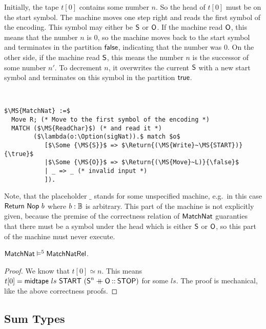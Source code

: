 Initially, the tape $t[0]$ contains some number $n$.  So the head of $t[0]$ must be on the start symbol.  The machine moves one step right and reads
the first symbol of the encoding.  This symbol may either be $\textsf{S}$ or $\textsf{O}$.  If the machine read $\textsf{O}$, this means that the number $n$ is
$0$, so the machine moves back to the start symbol and terminates in the partition $\textsf{false}$, indicating that the number was $0$.  On the other side,
if the machine read $\textsf{S}$, this means the number $n$ is the successor of some number $n'$.  To decrement $n$, it overwrites the current $\textsf{S}$
with a new start symbol and terminates on this symbol in the partition $\textsf{true}$.

\begin{definition}[$\MS{MatchNat}$]
  \label{def:MatchNat}
  ~
\begin{lstlisting}[style=semicoqstyle]
$\MS{MatchNat} :=$
  Move R; (* Move to the first symbol of the encoding *)
  MATCH ($\MS{ReadChar}$) (* and read it *)
        ($\lambda(o:\Option(sigNat)).$ match $o$
           [$\Some {\MS{S}}$ => $\Return{(\MS{Write}~\MS{START})}{\true}$
           |$\Some {\MS{O}}$ => $\Return{(\MS{Move}~L)}{\false}$
           | _ => _ (* invalid input *)
           ]).
\end{lstlisting}
\end{definition}

Note, that the placeholder $\_$ stands for some unspecified machine, e.g.\ in this case $\textsf{Return}~\textsf{Nop}~b$ where $b:\mathbb{B}$ is arbitrary.  This part of
the machine is not explicitly given, because the premise of the correctness relation of $\MS{MatchNat}$ guaranties that there must be a symbol under
the head which is either $\textsf{S}$ or $\textsf{O}$, so this part of the machine must never execute.

\begin{lemma}
  $\textsf{MatchNat} \vDash^5 \textsf{MatchNatRel}$.
\end{lemma}
\begin{proof}
  We know that $t[0] \simeq n$.  This means $t[0] = \textsf{midtape}~ls~\textsf{START}~(\textsf{S}^n \mathbin{+\mkern-10mu+} \textsf{O} \mathbin{::} \textsf{STOP})$ for some $ls$.  The proof is
  mechanical, like the above correctness proofs.
\end{proof}


\subsection{Sum Types}
\label{sec:match-sum}

